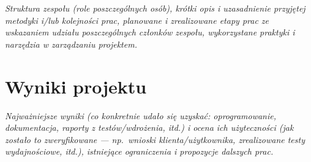 \documentclass[polish,12pt]{aghthesis}
\begin{document}
\emph{Struktura zespołu (role poszczególnych osób), krótki opis i
  uzasadnienie przyjętej metodyki i/lub kolejności prac, planowane i
  zrealizowane etapy prac ze wskazaniem udziału poszczególnych
  członków zespołu, wykorzystane praktyki i narzędzia w zarządzaniu
  projektem.}

\section{Wyniki projektu}

\label{sec:wyniki-projektu}

\emph{Najważniejsze wyniki (co konkretnie udało się uzyskać:
  oprogramowanie, dokumentacja, raporty z testów/wdrożenia, itd.)
  i ocena ich użyteczności (jak zostało to zweryfikowane --- np.\ wnioski
  klienta/użytkownika, zrealizowane testy wydajnościowe, itd.),
  istniejące ograniczenia i propozycje dalszych prac.}


\nocite{artykul2011,ksiazka2011,narzedzie2011,projekt2011}


\end{document}

